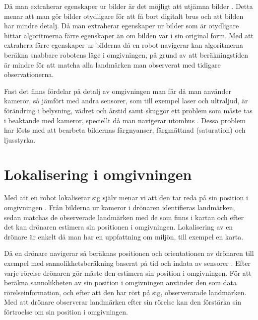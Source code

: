 Då man extraherar egenskaper ur bilder är det möjligt att utjämna bilder \citep{mapbuildingsift}. Detta menar att man gör bilder otydligare för att få bort digitalt brus och att bilden har mindre detalj. Då man extraherar egenskaper ur bilder som är otydligare hittar algoritmerna färre egenskaper än om bilden var i sin original form. Med att extrahera färre egenskaper ur bilderna då en robot navigerar kan algoritmerna beräkna snabbare robotens läge i omgivningen, på grund av att beräkningstiden är mindre för att matcha alla landmärken man observerat med tidigare observationerna.

Fast det finns fördelar på detalj av omgivningen man får då man använder kameror, så jämfört med andra sensorer, som till exempel laser och ultraljud, är förändring i belysning, vädret och årstid samt skuggor ett problem som måste tas i beaktande med kameror, speciellt då man navigerar utomhus \citep{982903}. Dessa problem har lösts med att bearbeta bildernas färgnyanser, färgmättnad (saturation) och ljusstyrka.

\section{Lokalisering i omgivningen}

Med att en robot lokaliserar sig själv menar vi att den tar reda på sin position i omgivningen \citep{982903}. Från bilderna ur kameror i drönaren identifieras landmärken, sedan matchas de observerade landmärken med de som finns i kartan och efter det kan drönaren estimera sin positionen i omgivningen. Lokalisering av en drönare är enkelt då man har en uppfattning om miljön, till exempel en karta.

Då en drönare navigerar så beräknas positionen och orientationen av drönaren till exempel med sannolikhetsberäkning baserat på tid och indata av sensorer \citep{ProbabilisticRobotics}. Efter varje rörelse drönaren gör måste den estimera sin position i omgivningen. För att beräkna sannolikheten av sin position i omgivningen använder den som data rörelseinformation, och efter att den har rört på sig, observerarade landmärken. Med att drönare observerar landmärken efter sin rörelse kan den förstärka sin förtroelse om sin position i omgivningen. 

